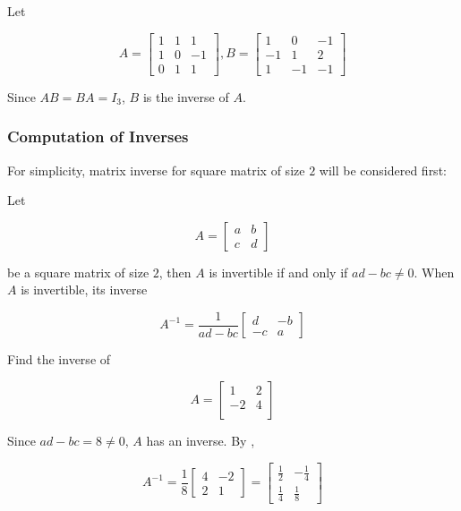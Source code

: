 \documentclass[a4paper,12pt]{article}
\begin{document}
\begin{exm}
  Let

  $$A=\begin{bmatrix}
    1 & 1 & 1\\
    1 & 0 & -1\\
    0 & 1 & 1
  \end{bmatrix},B=\begin{bmatrix}
    1 & 0 & -1\\
    -1 & 1 & 2\\
    1 & -1 & -1
  \end{bmatrix}$$\s

  Since $AB=BA=I_{3}$, $B$ is the inverse of $A$.
\end{exm}

\subsubsection{Computation of Inverses}
For simplicity, matrix inverse for square matrix of size $2$ will be considered first:\n

\begin{thm}
  Let

  $$A=\begin{bmatrix}
    a & b\\
    c & d
  \end{bmatrix}$$\s

  be a square matrix of size $2$, then $A$ is invertible if and only if $ad-bc\neq 0$. When $A$ is invertible, its inverse

  $$A^{-1}=\frac{1}{ad-bc}\begin{bmatrix}
    d & -b\\
    -c & a
  \end{bmatrix}$$
\end{thm}\n

\begin{exm}
  Find the inverse of
  
  $$A=\begin{bmatrix}
    1 & 2\\
    -2 & 4\\
  \end{bmatrix}$$\s

  \ans Since $ad-bc=8\neq 0$, $A$ has an inverse. By \rthm[\sctd{1}],

  $$A^{-1}=\frac{1}{8}\begin{bmatrix}
    4 & -2\\
    2 & 1
  \end{bmatrix}=\begin{bmatrix}
    \frac{1}{2} & -\frac{1}{4}\\
    \frac{1}{4} & \frac{1}{8}
  \end{bmatrix}$$
\end{exm}\n
\end{document}
